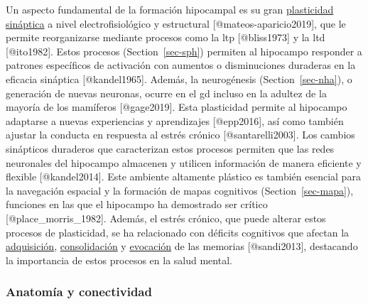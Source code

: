 \documentclass[
  11pt]{../MastersDoctoralThesisUNAM}
\begin{document}
Un aspecto fundamental de la formación hipocampal es su gran
\href{AppendixB.qmd\#term-id-15}{plasticidad sináptica} a nivel
electrofisiológico y estructural {[}@mateos-aparicio2019{]}, que le
permite reorganizarse mediante procesos como la
\ac{ltp} {[}@bliss1973{]} y la \ac{ltd} {[}@ito1982{]}. Estos procesos
(Section~\ref{sec-sph}) permiten al hipocampo responder a patrones
específicos de activación con aumentos o disminuciones duraderas en la
eficacia sináptica {[}@kandel1965{]}. Además, la neurogénesis
(Section~\ref{sec-nha}), o generación de nuevas neuronas, ocurre en el
\ac{gd} incluso en la adultez de la mayoría de los mamíferos
{[}@gage2019{]}. Esta plasticidad permite al hipocampo adaptarse a
nuevas experiencias y aprendizajes {[}@epp2016{]}, así como también
ajustar la conducta en respuesta al estrés crónico
{[}@santarelli2003{]}. Los cambios sinápticos duraderos que caracterizan
estos procesos permiten que las redes neuronales del hipocampo almacenen
y utilicen información de manera eficiente y flexible {[}@kandel2014{]}.
Este ambiente altamente plástico es también esencial para la navegación
espacial y la formación de mapas cognitivos (Section~\ref{sec-mapa}),
funciones en las que el hipocampo ha demostrado ser crítico
{[}@place\_morris\_1982{]}. Además, el estrés crónico, que puede alterar
estos procesos de plasticidad, se ha relacionado con déficits cognitivos
que afectan la \href{AppendixB.qmd\#term-id-9}{adquisición},
\href{AppendixB.qmd\#term-id-10}{consolidación} y
\href{AppendixB.qmd\#term-id-12}{evocación} de las memorias
{[}@sandi2013{]}, destacando la importancia de estos procesos en la
salud mental.

\subsubsection{Anatomía y
conectividad}\label{anatomuxeda-y-conectividad}
\end{document}
